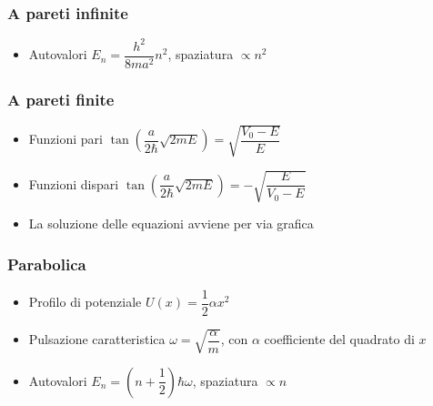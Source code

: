 \documentclass[9pt]{extarticle}
\begin{document}
\subsubsection{A pareti infinite}
\begin{itemize}
  \item Autovalori \( E_n = \dfrac{h^2}{8 m a ^2} n^2 \), spaziatura \( \propto n^2 \)
\end{itemize}

\subsubsection{A pareti finite}
\begin{itemize}
  \item Funzioni pari \( \tan\left( \dfrac{a}{2 \hbar} \sqrt{2mE} \right) = \sqrt{\dfrac{V_0 - E}{E}} \)
  \item Funzioni dispari \( \tan\left( \dfrac{a}{2 \hbar} \sqrt{2mE} \right) = - \sqrt{\dfrac{E}{V_0 - E}} \)
  \item La soluzione delle equazioni avviene per via grafica
\end{itemize}

\subsubsection{Parabolica}
\begin{itemize}
  \item Profilo di potenziale \( U(x) = \dfrac{1}{2} \alpha x ^ 2 \)
  \item Pulsazione caratteristica \( \displaystyle \omega = \sqrt{\dfrac{\alpha}{m}} \), con \( \alpha \) coefficiente del quadrato di \( x \)
  \item Autovalori \( E_n = \left( n + \dfrac{1}{2} \right) \hbar \omega \),  spaziatura \( \propto n \)
\end{itemize}
\end{document}
